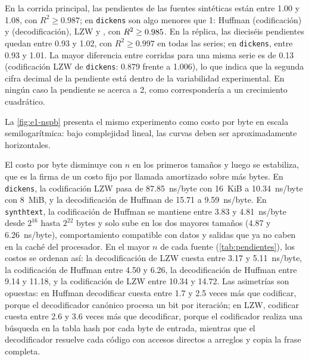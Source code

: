 En la corrida principal, las pendientes de las fuentes sintéticas están entre 1.00 y 1.08, con
$R^2 \ge 0.987$; en \texttt{dickens} son algo menores que 1: Huffman \resSlopeDickensHuffEnc{}
(codificación) y \resSlopeDickensHuffDec{} (decodificación), LZW \resSlopeDickensLzwEnc{} y
\resSlopeDickensLzwDec{}, con $R^2 \ge 0.985$. En la réplica, las dieciséis
pendientes quedan entre 0.93 y 1.02, con $R^2 \ge 0.997$ en todas las series; en
\texttt{dickens}, entre 0.93 y 1.01. La mayor diferencia entre corridas para una misma serie es
de 0.13 (codificación LZW de \texttt{dickens}: 0.879 frente a 1.006), lo que indica que la
segunda cifra decimal de la pendiente está dentro de la variabilidad experimental. En ningún
caso la pendiente se acerca a 2, como correspondería a un crecimiento cuadrático.

La \cref{fig:e1-nspb} presenta el mismo experimento como costo por byte en escala
semilogarítmica: bajo complejidad lineal, las curvas deben ser aproximadamente horizontales.


El costo por byte disminuye con $n$ en los primeros tamaños y luego se estabiliza, que es la
firma de un costo fijo por llamada amortizado sobre más bytes. En \texttt{dickens}, la
codificación LZW pasa de 87.85~ns/byte con 16~KiB a 10.34~ns/byte con 8~MiB, y la
decodificación de Huffman de 15.71 a 9.59~ns/byte. En \texttt{synthtext}, la codificación de
Huffman se mantiene entre 3.83 y 4.81~ns/byte desde $2^{16}$ hasta $2^{22}$ bytes y solo sube en
los dos mayores tamaños (4.87 y 6.26~ns/byte), comportamiento compatible con datos y salidas que
ya no caben en la caché del procesador. En el mayor $n$ de cada fuente
(\cref{tab:pendientes}), los costos se ordenan así: la decodificación de LZW cuesta entre 3.17 y
5.11~ns/byte, la codificación de Huffman entre 4.50 y 6.26, la decodificación de Huffman entre
9.14 y 11.18, y la codificación de LZW entre 10.34 y 14.72. Las asimetrías son opuestas: en
Huffman decodificar cuesta entre 1.7 y 2.5 veces más que codificar, porque el decodificador
canónico procesa un bit por iteración; en LZW, codificar cuesta entre 2.6 y 3.6 veces más que
decodificar, porque el codificador realiza una búsqueda en la tabla hash por cada byte de entrada,
mientras que el decodificador resuelve cada código con accesos directos a arreglos y copia la
frase completa.

